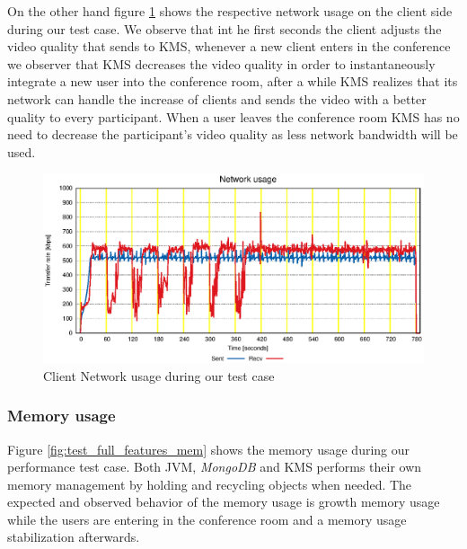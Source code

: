 On the other hand figure \ref{fig:test_client_net} shows the respective network usage on the client side during our test case. We observe that int he first seconds the client adjusts the video quality that sends to \ac{KMS}, whenever a new client enters in the conference we observer that \ac{KMS} decreases the video quality in order to instantaneously integrate a new user into the conference room, after a while \ac{KMS} realizes that its network can handle the increase of clients and sends the video with a better quality to every participant. When a user leaves the conference room \ac{KMS} has no need to decrease the participant's video quality as less network bandwidth will be used.

\begin{figure}[!htb]
  \centering
  \includegraphics[width=\textwidth]{stats/test_client_net.eps}
  \caption{Client Network usage during our test case}
  \label{fig:test_client_net}
\end{figure}



\subsubsection{Memory usage}


Figure \ref{fig:test_full_features_mem} shows the memory usage during our performance test case. Both \ac{JVM}, \emph{MongoDB} and \ac{KMS} performs their own memory management by holding and recycling objects when needed. The expected and observed behavior of the memory usage is growth memory usage while the users are entering in the conference room and a memory usage stabilization afterwards.



